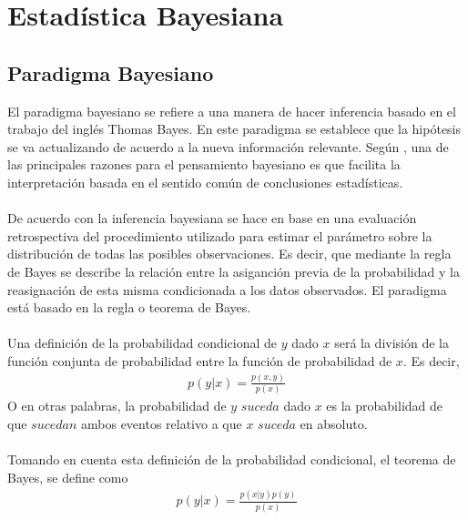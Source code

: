 \chapter{Estad\'istica Bayesiana}
\section{Paradigma Bayesiano}
El paradigma bayesiano se refiere a una manera de hacer inferencia basado en el trabajo del ingl\'es Thomas Bayes. En este paradigma se establece que la hip\'otesis se va actualizando de acuerdo a la nueva informaci\'on  relevante. Seg\'un \cite{gelman2014bayesian}, una de las principales razones para el pensamiento bayesiano es que facilita la interpretaci\'on basada en el sentido com\'un de conclusiones estad\'isticas. \\
\\
De acuerdo con \cite{gelman2014bayesian} la inferencia bayesiana se hace en base en una evaluaci\'on retrospectiva del procedimiento utilizado para estimar el par\'ametro sobre la distribuci\'on de todas las posibles observaciones. Es decir, que mediante la regla de Bayes se describe la relaci\'on entre la asiganci\'on previa de la probabilidad y la reasignaci\'on de esta misma condicionada a los datos observados. El paradigma est\'a basado en la regla o teorema de Bayes.\\
\\
Una definici\'on de la probabilidad condicional de $y$ dado $x$  ser\'a la divisi\'on de la funci\'on conjunta de probabilidad entre la funci\'on de probabilidad de $x$. Es decir,
\begin{align*}
p(y|x)=\frac{p(x,y)}{p(x)}
\end{align*}
O en otras palabras, la probabilidad de $y$ $suceda$ dado $x$ es la probabilidad de que $sucedan$ ambos eventos relativo a que $x$ $suceda$ en absoluto.\\
\\
Tomando en cuenta esta definici\'on de la probabilidad condicional, el teorema de Bayes, se define como
\begin{align*}
p(y|x)=\frac{p(x|y)p(y)}{p(x)}
\end{align*}
